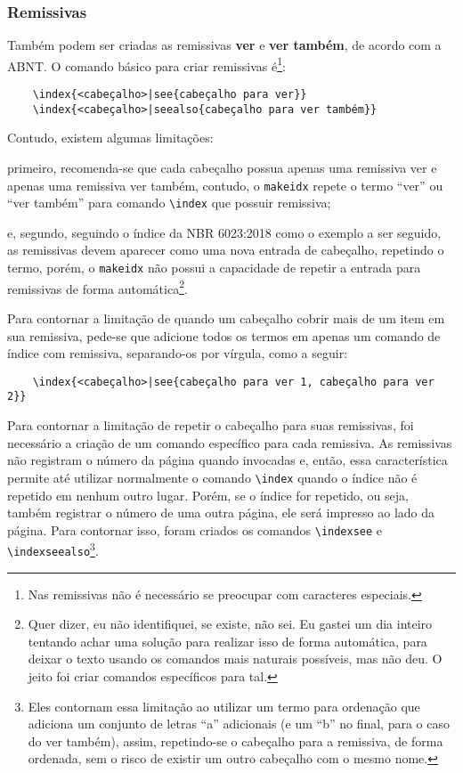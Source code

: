     \subsubsection{Remissivas}
    Também podem ser criadas as remissivas \textbf{ver} e \textbf{ver também}, de acordo com a ABNT. O comando básico para criar remissivas é\footnote{Nas remissivas não é necessário se preocupar com caracteres especiais.}:
\begin{verbatim}
    \index{<cabeçalho>|see{cabeçalho para ver}}
    \index{<cabeçalho>|seealso{cabeçalho para ver também}}
\end{verbatim}%
Contudo, existem algumas limitações: 
\begin{alinea}
    \item primeiro, recomenda-se que cada cabeçalho possua apenas uma remissiva ver e apenas uma remissiva ver também, contudo, o \texttt{makeidx} repete o termo ``ver'' ou ``ver também'' para comando \verb|\index| que possuir remissiva; 
    \item e, segundo, seguindo o índice da NBR 6023:2018 como o exemplo a ser seguido, as remissivas devem aparecer como uma nova entrada de cabeçalho, repetindo o termo, porém, o \texttt{makeidx} não possui a capacidade de repetir a entrada para remissivas de forma automática\footnote{Quer dizer, eu não identifiquei, se existe, não sei. Eu gastei um dia inteiro tentando achar uma solução para realizar isso de forma automática, para deixar o texto usando os comandos mais naturais possíveis, mas não deu. O jeito foi criar comandos específicos para tal.}.
\end{alinea}

    Para contornar a limitação de quando um cabeçalho cobrir mais de um item em sua remissiva, pede-se que adicione todos os termos em apenas um comando de índice com remissiva, separando-os por vírgula, como a seguir:
\begin{verbatim}
    \index{<cabeçalho>|see{cabeçalho para ver 1, cabeçalho para ver 2}}
\end{verbatim}%

    Para contornar a limitação de repetir o cabeçalho para suas remissivas, foi necessário a criação de um comando específico para cada remissiva. As remissivas não registram o número da página quando invocadas e, então, essa característica permite até utilizar normalmente o comando \verb|\index| quando o índice não é repetido em nenhum outro lugar. Porém, se o índice for repetido, ou seja, também registrar o número de uma outra página, ele será impresso ao lado da página. Para contornar isso, foram criados os comandos \verb|\indexsee| e \verb|\indexseealso|\footnote{Eles contornam essa limitação ao utilizar um termo para ordenação que adiciona um conjunto de letras ``a'' adicionais (e um ``b'' no final, para o caso do ver também), assim, repetindo-se o cabeçalho para a remissiva, de forma ordenada, sem o risco de existir um outro cabeçalho com o mesmo nome.}.

